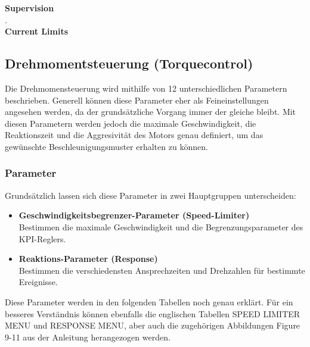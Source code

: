 \textbf{Supervision}\\[1mm]
.
\\[3mm]

\textbf{Current Limits}\\[1mm]



\newpage

\subsection{Drehmomentsteuerung (Torquecontrol)}
Die Drehmomensteuerung wird mithilfe von 12 unterschiedlichen Parametern beschrieben. Generell können diese Parameter eher als Feineinstellungen angesehen werden, da der grundsätzliche Vorgang immer der gleiche bleibt. Mit diesen Parametern werden jedoch die maximale Geschwindigkeit, die Reaktionszeit und die Aggresivität des Motors genau definiert, um das gewünschte Beschleunigungsmuster erhalten zu können.

\vspace{1mm}
 
\subsubsection{Parameter}
Grundsätzlich lassen sich diese Parameter in zwei Hauptgruppen unterscheiden:
\\[5mm]
\begin{itemize}
	\item \textbf{Geschwindigkeitsbegrenzer-Parameter (Speed-Limiter)}
	\\ \medskip Bestimmen die maximale Geschwindigkeit und die Begrenzungsparameter des KPI-Reglers.
	\medskip
	\item \textbf{Reaktions-Parameter (Response)}
	\\ \medskip Bestimmen die verschiedensten Ansprechzeiten und Drehzahlen für bestimmte Ereignisse.
\end{itemize}

\vspace{5mm}

Diese Parameter werden in den folgenden Tabellen noch genau erklärt. Für ein besseres Verständnis können ebenfalls die englischen Tabellen \glqq SPEED LIMITER MENU\grqq{} und \glqq RESPONSE MENU\grqq{}, aber auch die zugehörigen Abbildungen \glqq Figure 9-11\grqq{} aus der Anleitung herangezogen werden.




